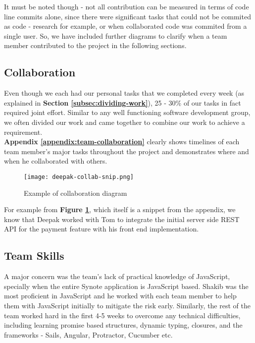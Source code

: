 It must be noted though - not all contribution can be measured in terms of code line commits alone, since there were significant tasks that could not be commited as code - research for example, or when collaborated code was commited from a single user. So, we have included further diagrams to clarify when a team member contributed to the project in the following sections.

\subsection{Collaboration}
\label{subsec:collaboration}

Even though we each had our personal tasks that we completed every week (as explained in \textbf{Section \ref{subsec:dividing-work}}), 25 - 30\% of our tasks in fact required joint effort. Similar to any well functioning software development group, we often divided our work and came together to combine our work to achieve a requirement.\\

\textbf{Appendix \ref{appendix:team-collaboration}} clearly shows timelines of each team member's major tasks throughout the project and demonstrates where and when he collaborated with others.\\

\begin{figure}[!hbt]
  	\centering
 	\texttt{[image: deepak-collab-snip.png]}
  	\caption{Example of collaboration diagram}
 	\label{fig:deepak-collaboration-snippet}
\end{figure}

For example from \textbf{Figure \ref{fig:deepak-collaboration-snippet}}, which itself is a snippet from the appendix, we know that Deepak worked with Tom to integrate the initial server side REST API for the payment feature with his front end implementation.

\subsection{Team Skills}
\label{subsec:team-skills}

A major concern was the team's lack of practical knowledge of JavaScript, specially when the entire Synote application is JavaScript based. Shakib was the most proficient in JavaScript and he worked with each team member to help them with JavaScript initially to mitigate the risk early. Similarly, the rest of the team worked hard in the first 4-5 weeks to overcome any technical difficulties, including learning promise based structures, dynamic typing, closures, and the frameworks - Sails, Angular, Protractor, Cucumber etc.\\

